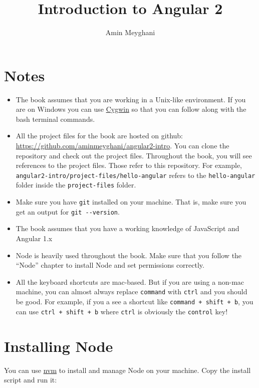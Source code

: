 \documentclass[12pt,]{article}
\title{Introduction to Angular 2}
\author{Amin Meyghani}
\date{}
\begin{document}
\maketitle

{
\hypersetup{linkcolor=black}
\setcounter{tocdepth}{5}
\tableofcontents
}
\section{Notes}\label{notes}

\begin{itemize}
\item
  The book assumes that you are working in a Unix-like environment. If
  you are on Windows you can use \href{https://www.cygwin.com/}{Cygwin}
  so that you can follow along with the bash terminal commands.
\item
  All the project files for the book are hosted on github:
  \url{https://github.com/aminmeyghani/angular2-intro}. You can clone
  the repository and check out the project files. Throughout the book,
  you will see references to the project files. Those refer to this
  repository. For example,
  \texttt{angular2-intro/project-files/hello-angular} refers to the
  \texttt{hello-angular} folder inside the \texttt{project-files}
  folder.
\item
  Make sure you have \texttt{git} installed on your machine. That is,
  make sure you get an output for \texttt{git\ -\/-version}.
\item
  The book assumes that you have a working knowledge of JavaScript and
  Angular 1.x
\item
  Node is heavily used throughout the book. Make sure that you follow
  the ``Node'' chapter to install Node and set permissions correctly.
\item
  All the keyboard shortcuts are mac-based. But if you are using a
  non-mac machine, you can almost always replace \texttt{command} with
  \texttt{ctrl} and you should be good. For example, if you a see a
  shortcut like \texttt{command\ +\ shift\ +\ b}, you can use
  \texttt{ctrl\ +\ shift\ +\ b} where \texttt{ctrl} is obviously the
  \texttt{control} key!
\end{itemize}

\section{Installing Node}\label{installing-node}

You can use \href{https://github.com/creationix/nvm}{nvm} to install and
manage Node on your machine. Copy the install script and run it:
\end{document}
